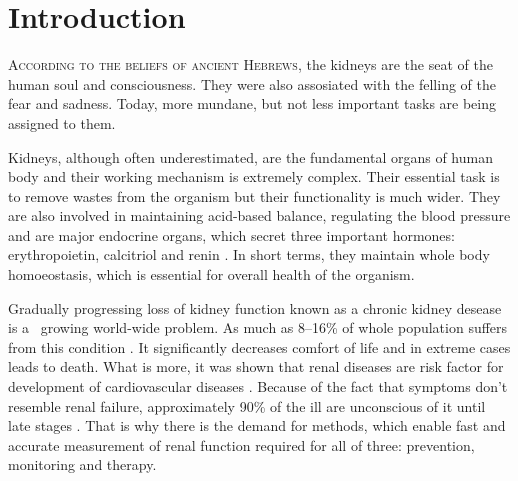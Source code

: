 	\setcounter{page}{1}
	
	
\chapter*{Introduction}



\lettrine[lines=3, slope=1em, findent=-0.8em]{A}{ccording to the beliefs of ancient Hebrews}, the kidneys are the seat of the human soul and consciousness. They were also assosiated with the felling of the fear and sadness\cite {maio1999metaphorical}. Today, more mundane, but not less important tasks are being assigned to them. 

Kidneys, although often underestimated, are the fundamental organs of human body and their working mechanism is extremely complex. Their essential task is to remove wastes from the organism but their functionality is much wider. They are also involved in maintaining acid-based balance, regulating the blood pressure and are major endocrine organs, which secret three important hormones: erythropoietin, calcitriol and renin \cite{saladin}. In short terms, they maintain whole body homoeostasis, which is essential for overall health of the organism. 

Gradually progressing loss of kidney function known as a chronic kidney desease is a~ growing world-wide problem. As much as 8--16\% of whole population suffers from this condition \cite{statistics}. It significantly decreases comfort of life and in extreme cases leads to death. What is more, it was shown that renal diseases are risk factor for development of cardiovascular diseases \cite{cardiovascular_diseases}.
Because of the fact that symptoms don't resemble renal failure, approximately 90\% of the ill are unconscious of it until late stages \cite{national_kidney_foundation}. That is why there is the demand for methods, which enable fast and accurate measurement of renal function required for all of three: prevention, monitoring and therapy.

